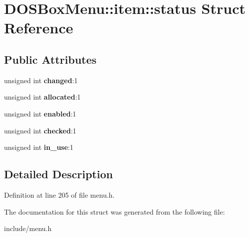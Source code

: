 \hypertarget{structDOSBoxMenu_1_1item_1_1status}{\section{D\-O\-S\-Box\-Menu\-:\-:item\-:\-:status Struct Reference}
\label{structDOSBoxMenu_1_1item_1_1status}
}
\subsection*{Public Attributes}
\begin{DoxyCompactItemize}
\item 
\hypertarget{structDOSBoxMenu_1_1item_1_1status_aa4f8abd7e72a494212a6082f7f599c11}{unsigned int {\bfseries changed}\-:1}\label{structDOSBoxMenu_1_1item_1_1status_aa4f8abd7e72a494212a6082f7f599c11}

\item 
\hypertarget{structDOSBoxMenu_1_1item_1_1status_a187af4bc1b360547841fd771c4d415e1}{unsigned int {\bfseries allocated}\-:1}\label{structDOSBoxMenu_1_1item_1_1status_a187af4bc1b360547841fd771c4d415e1}

\item 
\hypertarget{structDOSBoxMenu_1_1item_1_1status_aec8684a6d58444febc1db66aa604c299}{unsigned int {\bfseries enabled}\-:1}\label{structDOSBoxMenu_1_1item_1_1status_aec8684a6d58444febc1db66aa604c299}

\item 
\hypertarget{structDOSBoxMenu_1_1item_1_1status_a10170b369becf69be194bac19c92d58b}{unsigned int {\bfseries checked}\-:1}\label{structDOSBoxMenu_1_1item_1_1status_a10170b369becf69be194bac19c92d58b}

\item 
\hypertarget{structDOSBoxMenu_1_1item_1_1status_a2bc81ac9e76ce71e691d123618377194}{unsigned int {\bfseries in\-\_\-use}\-:1}\label{structDOSBoxMenu_1_1item_1_1status_a2bc81ac9e76ce71e691d123618377194}

\end{DoxyCompactItemize}


\subsection{Detailed Description}


Definition at line 205 of file menu.\-h.



The documentation for this struct was generated from the following file\-:\begin{DoxyCompactItemize}
\item 
include/menu.\-h\end{DoxyCompactItemize}
